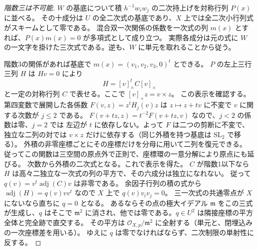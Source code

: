 \begin{proof}[階数三は不可能]
$W$ の基底について積 $h^{-1}w_i w_j$ の二次持上げを対称行列 $P(x)$ に並べる。
その十成分は $U$ の全二次式の基底であり、$X$ 上では全二次小行列式がスキームとして零である。
混合双一次関係の係数を一次式の列 $m(x)$ とすれば、$P(x)m(x)=0$ が多項式として成り立つ。
実際各成分は元の式に $W$ の一文字を掛けた三次式である。逆も、$W$ に単元を取れることから従う。

階数3の関係があれば基底で $m(x)=(v_1,v_2,v_3,0)^t$ とできる。
$P$ の左上三行三列 $H$ は $H v=0$ により
\[
 H=[v]_\times^t C [v]_\times
\]
と一定の対称行列 $C$ で表せる。ここで $[v]_\times z=v\times z$。
この表示を確認する。第四変数で展開した各係数 $F(v,z)=z^t H_j(v)z$ は
$z\mapsto z+t v$ に不変で $v$ に関する次数が $j\le2$ である。
$F(v+t z,z)=t^{-2}F(v+t z,v)$ なので、$j<2$ の係数は零、$j=2$ では
左辺が $t$ に依存しない。よって $F$ は二つの剪断に不変で、独立な二列の対では
$v\times z$ だけに依存する（同じ外積を持つ基底は $\mathrm{SL}_2$ で移る）。
外積の非零座標ごとにその座標だけを分母に用いて二列を復元できる。
従ってこの関数は三空間の原点外で正則で、座標環の一意分解により原点にも延びる。
次数から外積の二次式となる。これで表示を得た。
$C$ が階数1以下なら $H$ は高々二独立な一次式の列の平方で、その六成分は独立になれない。
従って $q(v)=v^t\operatorname{adj}(C)v$ は非零である。
余因子行列の積の式から $\operatorname{adj}(H)=q(v)vv^t$ なので $X$ 上で $q(v)v_i v_j=0$。
三一次式の共通零点が $X$ にないなら直ちに $q=0$ となる。
あるならその点の極大イデアル $\mathfrak m$ をこの三式が生成し、$q$ はそこで
$\mathfrak m^2$ に消され、他では零である。$q\in U^2$ は隣接座標の平方全体と完全跡で直交する。
その平方は $\mathcal O_{X,p}/\mathfrak m^2$ に全射する（単元と、閉埋込みの一次座標差を用いる）。
ゆえに $q$ は零でなければならず、二次制限の単射性に反する。

\end{proof}
